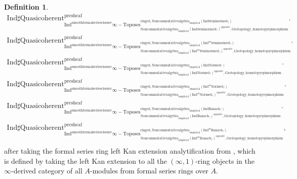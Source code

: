 \documentclass[11pt]{book}
\theoremstyle{definition}
\newtheorem{definition}[theorem]{Definition}
\numberwithin{equation}{section}
\begin{document}
\begin{definition}
 \begin{align}
\mathrm{Ind}\mathrm{\sharp Quasicoherent}^{\text{presheaf}}_{\mathrm{Ind}^\text{smoothformalseriesclosure}\infty-\mathrm{Toposes}^{\mathrm{ringed},\mathrm{Noncommutativealgebra}_{\mathrm{simplicial}}(\mathrm{Ind}\mathrm{Seminormed}_?)}_{\mathrm{Noncommutativealgebra}_{\mathrm{simplicial}}(\mathrm{Ind}\mathrm{Seminormed}_?)^\mathrm{opposite},\mathrm{Grotopology,homotopyepimorphism}}}. \\
\mathrm{Ind}\mathrm{\sharp Quasicoherent}^{\text{presheaf}}_{\mathrm{Ind}^\text{smoothformalseriesclosure}\infty-\mathrm{Toposes}^{\mathrm{ringed},\mathrm{Noncommutativealgebra}_{\mathrm{simplicial}}(\mathrm{Ind}^m\mathrm{Seminormed}_?)}_{\mathrm{Noncommutativealgebra}_{\mathrm{simplicial}}(\mathrm{Ind}^m\mathrm{Seminormed}_?)^\mathrm{opposite},\mathrm{Grotopology,homotopyepimorphism}}}.\\
\mathrm{Ind}\mathrm{\sharp Quasicoherent}^{\text{presheaf}}_{\mathrm{Ind}^\text{smoothformalseriesclosure}\infty-\mathrm{Toposes}^{\mathrm{ringed},\mathrm{Noncommutativealgebra}_{\mathrm{simplicial}}(\mathrm{Ind}\mathrm{Normed}_?)}_{\mathrm{Noncommutativealgebra}_{\mathrm{simplicial}}(\mathrm{Ind}\mathrm{Normed}_?)^\mathrm{opposite},\mathrm{Grotopology,homotopyepimorphism}}}.\\
\mathrm{Ind}\mathrm{\sharp Quasicoherent}^{\text{presheaf}}_{\mathrm{Ind}^\text{smoothformalseriesclosure}\infty-\mathrm{Toposes}^{\mathrm{ringed},\mathrm{Noncommutativealgebra}_{\mathrm{simplicial}}(\mathrm{Ind}^m\mathrm{Normed}_?)}_{\mathrm{Noncommutativealgebra}_{\mathrm{simplicial}}(\mathrm{Ind}^m\mathrm{Normed}_?)^\mathrm{opposite},\mathrm{Grotopology,homotopyepimorphism}}}.\\
\mathrm{Ind}\mathrm{\sharp Quasicoherent}^{\text{presheaf}}_{\mathrm{Ind}^\text{smoothformalseriesclosure}\infty-\mathrm{Toposes}^{\mathrm{ringed},\mathrm{Noncommutativealgebra}_{\mathrm{simplicial}}(\mathrm{Ind}\mathrm{Banach}_?)}_{\mathrm{Noncommutativealgebra}_{\mathrm{simplicial}}(\mathrm{Ind}\mathrm{Banach}_?)^\mathrm{opposite},\mathrm{Grotopology,homotopyepimorphism}}}.\\
\mathrm{Ind}\mathrm{\sharp Quasicoherent}^{\text{presheaf}}_{\mathrm{Ind}^\text{smoothformalseriesclosure}\infty-\mathrm{Toposes}^{\mathrm{ringed},\mathrm{Noncommutativealgebra}_{\mathrm{simplicial}}(\mathrm{Ind}^m\mathrm{Banach}_?)}_{\mathrm{Noncommutativealgebra}_{\mathrm{simplicial}}(\mathrm{Ind}^m\mathrm{Banach}_?)^\mathrm{opposite},\mathrm{Grotopology,homotopyepimorphism}}},\\ 
\end{align}
after taking the formal series ring left Kan extension analytification from \cite[Section 4.2]{BBM}, which is defined by taking the left Kan extension to all the $(\infty,1)$-ring objects in the $\infty$-derived category of all $A$-modules from formal series rings over $A$.
\end{definition}
\end{document}
